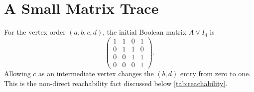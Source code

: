 \chapter{A Small Matrix Trace}
\label{app:matrix-trace}


For the vertex order $(a,b,c,d)$, the initial Boolean matrix $A\lor I_4$ is
\[
\begin{pmatrix}
1&1&0&1\\
0&1&1&0\\
0&0&1&1\\
0&0&0&1
\end{pmatrix}.
\]
Allowing $c$ as an intermediate vertex changes the $(b,d)$ entry from zero to
one. This is the non-direct reachability fact discussed below
\cref{tab:reachability}.
